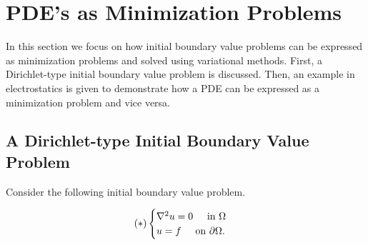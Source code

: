\documentclass{article}
\newcommand{\p}{\partial}
\begin{document}
\section{PDE's as Minimization Problems}

In this section we focus on how initial boundary value problems can be expressed as minimization problems and solved using variational methods. First, a Dirichlet-type initial boundary value problem is discussed. Then, an example in electrostatics is given to demonstrate how a PDE can be expressed as a minimization problem and vice versa. 

\subsection{A Dirichlet-type Initial Boundary Value Problem}

Consider the following initial boundary value problem. 

\begin{align}
(\ast) \begin{cases}
\nabla^2 u = 0 \hspace{0.5cm} \text{in $\Omega$}\\
u = f \hspace{0.5cm} \text{on $\p\Omega$}.
\end{cases}
\end{align}
\end{document}
